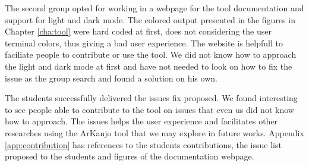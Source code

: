 The second group opted for working in a webpage for the tool documentation and support 
for light and dark mode. The colored output presented in the figures in Chapter \ref{cha:tool} 
were hard coded at first, does not considering the user terminal colors, 
thus giving a bad user experience. The website is helpfull to 
faciliate people to contribute or use the tool. We did not know how to approach the light and 
dark mode at first and have not needed to look on how
to fix the issue as the group search and found a solution on his own. 

The students successfully delivered the issues fix proposed. We found interesting to see 
people able to contribute to the tool on issues that even us did not know how to approach.
The issues helps the user experience and facilitates other researches using the ArKanjo tool 
that we may explore in future works. Appendix \ref{app:contribution} has references to the
students contributions, the issue list proposed to the students and figures of the 
documentation webpage.

